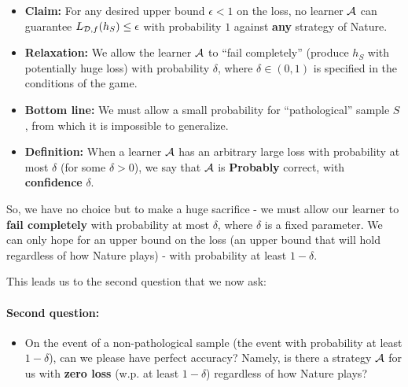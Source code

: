 {\begin{itemize}
      \item {\bf Claim:} For any desired upper bound $\epsilon<1$ on the loss, 
	no learner $\mathcal{A}$ can guarantee $L_{\mathcal{D},f}(h_S) \le
  \epsilon$ with probability $1$ against {\bf any} strategy of Nature. 
\item {\bf Relaxation:} We allow the learner $\mathcal{A}$ to ``fail completely''
  (produce $h_S$ with potentially huge loss) with
  probability $\delta$, where $\delta \in (0,1)$ is specified in the conditions
  of the game.
\item {\bf Bottom line:} We must allow a small probability for
  ``pathological'' sample $S$, from which it is impossible to generalize. 
\item {\bf Definition:} When a learner $\mathcal{A}$ has  an arbitrary large loss with probability
  at most $\delta$ (for some $\delta>0$), we say that $\mathcal{A}$ is {\bf Probably}
  correct, with {\bf confidence} $\delta$.
\end{itemize}

So, we have no choice but to make a huge sacrifice - we must allow our learner to
       {\bf fail completely} with probability at most $\delta$, where $\delta$ is a fixed parameter. 
       We can only hope for an upper bound on the
       loss (an upper bound that will hold regardless of how Nature plays) - with probability at least  $1-\delta$. 

   This leads us to the second question that we now ask:
   \paragraph{Second question:}
   \begin{itemize}

     \item On the event of a non-pathological sample (the event with probability at
	 least 
       $1-\delta$), can we please have perfect accuracy?  Namely, is there a
       strategy
       $\mathcal{A}$ for us with {\bf zero loss} (w.p. at least $1-\delta$) regardless of how Nature plays?
   \end{itemize}
  
}
